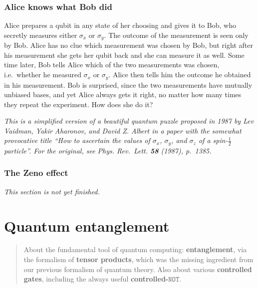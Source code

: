 \documentclass[fleqn,a4paper]{article}
\newenvironment{todo}{\color{primary}\emph{This section is not yet finished.}}{}
\let\oldsection\section
\renewcommand\section{\clearpage\oldsection}
\theoremstyle{definition}
\theoremstyle{definition}
\theoremstyle{definition}
\theoremstyle{definition}
\theoremstyle{remark}
\begin{document}
\hypertarget{alice-knows-what-bob-did}{%
\subsubsection{Alice knows what Bob did}\label{alice-knows-what-bob-did}}

Alice prepares a qubit in any state of her choosing and gives it to Bob, who secretly measures either \(\sigma_x\) or \(\sigma_y\).
The outcome of the measurement is seen only by Bob.
Alice has no clue which measurement was chosen by Bob, but right after his measurement she gets her qubit back and she can measure it as well.
Some time later, Bob tells Alice which of the two measurements was chosen, i.e.~whether he measured \(\sigma_x\) or \(\sigma_y\).
Alice then tells him the outcome he obtained in his measurement.
Bob is surprised, since the two measurements have mutually unbiased bases, and yet Alice always gets it right, no matter how many times they repeat the experiment.
How does she do it?

\emph{This is a simplified version of a beautiful quantum puzzle proposed in 1987 by Lev Vaidman, Yakir Aharonov, and David Z. Albert in a paper with the somewhat provocative title ``How to ascertain the values of \(\sigma_x\), \(\sigma_y\), and \(\sigma_z\) of a spin-\(\frac{1}{2}\) particle''. For the original, see \emph{Phys. Rev.~Lett.} \textbf{58} (1987), p.~1385.}

\hypertarget{the-zeno-effect}{%
\subsubsection{The Zeno effect}\label{the-zeno-effect}}

\begin{todo}

\end{todo}

\hypertarget{quantum-entanglement}{%
\section{Quantum entanglement}\label{quantum-entanglement}}

\begin{quote}
About the fundamental tool of quantum computing: \textbf{entanglement}, via the formalism of \textbf{tensor products}, which was the missing ingredient from our previous formalism of quantum theory.
Also about various \textbf{controlled gates}, including the always useful \textbf{controlled-\(\texttt{NOT}\)}.
\end{quote}
\end{document}
